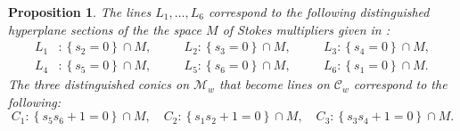 \documentclass[a4paper,reqno]{amsart}
\numberwithin{equation}{section}
\newtheorem{proposition}[theorem]{Proposition}
\numberwithin{equation}{section}
\begin{document}
\begin{proposition} \label{prop:monodromydatalinescurvesexplainedPII}
    The lines $L_1,\dots,L_{6}$ correspond to the following distinguished hyperplane sections of the the space $M$ of Stokes multipliers given in :
    \begin{equation*}
    \begin{aligned}
    L_1 &: \left\{ s_2 = 0 \right\} \cap M, \quad
    &&L_2 : \left\{ s_3 = 0 \right\} \cap M, \quad
    &&L_3 : \left\{ s_4 = 0 \right\} \cap M, \\
    L_4 &: \left\{ s_5 = 0 \right\} \cap M, \quad 
    &&L_5 : \left\{ s_6 = 0 \right\} \cap M, \quad
    &&L_6 : \left\{ s_1 = 0 \right\} \cap M. 
    \end{aligned}
    \end{equation*}
The three distinguished conics on $\mathcal{M}_w$ that become lines on $\mathcal{C}_w$ correspond to the following:
\begin{equation*}
    C_1 : \left\{s_5 s_6+1=0 \right\} \cap M, \quad
    C_2 : \left\{s_1 s_2+1=0 \right\} \cap M, \quad 
    C_3 : \left\{s_3 s_4+1=0 \right\} \cap M.
\end{equation*}

\end{proposition}
\end{document}

